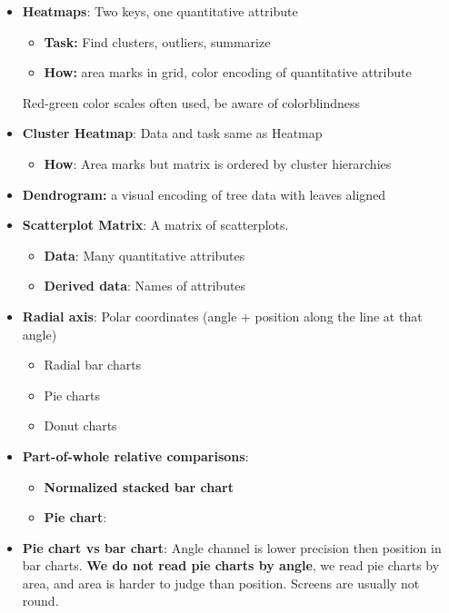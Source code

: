 \documentclass{report}
\begin{document}
\begin{itemize}
            Similar to scatterplots but allows ordered attributes
            \bigbreak \noindent 
            \bigbreak \noindent 
            \textbf{Note:} Trends in line charts are more apparent because we are using angle as a channel 
        \item \textbf{Heatmaps}: Two keys, one quantitative attribute 
            \begin{itemize}
                \item \textbf{Task:} Find clusters, outliers, summarize 
                \item \textbf{How:} area marks in grid, color encoding of quantitative attribute
            \end{itemize}
            Red-green color scales often used, be aware of colorblindness
        \item \textbf{Cluster Heatmap}: Data and task same as Heatmap
            \begin{itemize}
                \item \textbf{How}: Area marks but matrix is ordered by cluster hierarchies
            \end{itemize}
        \item \textbf{Dendrogram:} a visual encoding of tree data with leaves aligned
        \item \textbf{Scatterplot Matrix}: A matrix of scatterplots. 
            \begin{itemize}
                \item \textbf{Data}: Many quantitative attributes
                \item \textbf{Derived data}: Names of attributes
            \end{itemize}
        \item \textbf{Radial axis}: Polar coordinates (angle + position along the line at that angle)
            \bigbreak \noindent 
            \begin{itemize}
                \item Radial bar charts
                \item Pie charts
                \item Donut charts
            \end{itemize}
        \item \textbf{Part-of-whole relative comparisons}: 
            \begin{itemize}
                \item \textbf{Normalized stacked bar chart}
                \item \textbf{Pie chart}:
            \end{itemize}
        \item \textbf{Pie chart vs bar chart}: Angle channel is lower precision then position in bar charts. \textbf{We do not read pie charts by angle}, we read pie charts by area, and area is harder to judge than position. Screens are usually not round.


       
    \end{itemize}
\end{document}
